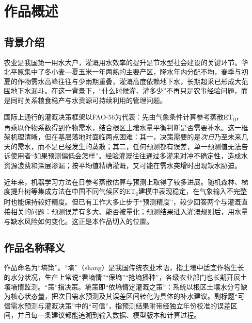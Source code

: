 \section{作品概述}
\subsection{背景介绍}
农业是我国第一用水大户，灌溉用水效率的提升是节水型社会建设的关键环节。华北平原集中了冬小麦—夏玉米一年两熟的主要产区，降水年内分配不均，春季与初夏的作物需水高峰往往与少雨期重叠，灌溉高度依赖地下水，长期超采已形成大范围地下水漏斗。在这一背景下，“什么时候灌、灌多少”不再只是农事经验问题，而是同时关系粮食稳产与水资源可持续利用的管理问题。

国际上通行的灌溉决策框架以FAO-56为代表：先由气象条件计算参考蒸散ET\textsubscript{0}，再乘以作物系数得到作物需水，结合根区土壤水量平衡判断是否需要补水\cite{fao,pereira}。这一框架机理清晰，但在基层落地时面临两点困难：其一，决策需要的是\emph{次日}乃至未来几天的需水，而不是已经发生的蒸散；其二，任何预测都有误差，单一预测值无法告诉使用者“如果预测偏低会怎样”。经验灌溉往往通过多灌来对冲不确定性，造成水资源浪费和深层渗漏；按平均值精确灌溉，又可能在需水突增时出现缺水胁迫\cite{fereres}。

近年来，机器学习方法在日参考蒸散估算与预测上取得了较多进展。随机森林、梯度提升树等集成方法在中国不同气候区的ET\textsubscript{0}建模中表现稳定，在气象输入不完整时也能保持较好精度\cite{fan,feng}。但已有工作大多止步于“预测精度”，较少回答两个与灌溉直接相关的问题：预测误差有多大、能否被量化；预测结果进入灌溉规则后，用水量与缺水风险如何变化。这正是本作品切入的位置。

\subsection{作品名称释义}
作品命名为“墒策”。“墒”（shāng）是我国传统农业术语，指土壤中适宜作物生长的水分状况，生产上常说“看墒情”“保墒”“抢墒播种”，各级农业部门也长期开展土壤墒情监测。“策”指决策。墒策即“依墒情定灌溉之策”：系统以根区土壤水分亏缺为核心状态量，把次日需水预测及其误差区间转化为具体的补水建议。副标题“可信需水预测与灌溉决策”中的“可信”，指预测结果附带经独立年份校准的误差区间，并且每一条建议都能追溯到输入数据、模型版本和计算过程。

